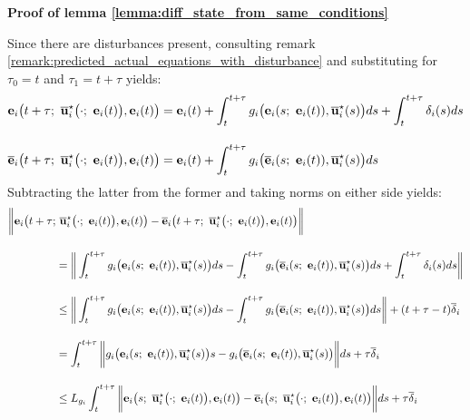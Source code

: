 \begin{gg_box}
\textbf{Proof of lemma \eqref{lemma:diff_state_from_same_conditions}}

Since there are disturbances present, consulting remark
\eqref{remark:predicted_actual_equations_with_disturbance} and substituting
for $\tau_0 = t$ and $\tau_1 = t + \tau$ yields:
\begin{align}
  \vect{e}_i\big(t + \tau;\ \overline{\vect{u}}_i^{\star}\big(\cdot;\ \vect{e}_i(t)\big), \vect{e}_i(t)\big) &=
    \vect{e}_i(t)
    + \int_{t}^{t + \tau} g_i\big(\vect{e}_i(s;\ \vect{e}_i(t)), \overline{\vect{u}}_i^{\star}(s)\big) ds
    + \int_{t}^{t + \tau}\delta_i(s)ds\\[2.5ex]
  \overline{\vect{e}}_i\big(t + \tau;\ \overline{\vect{u}}_i^{\star}\big(\cdot;\ \vect{e}_i(t)\big), \vect{e}_i(t)\big) &=
    \vect{e}_i(t) + \int_{t}^{t + \tau} g_i\big(\overline{\vect{e}}_i(s;\ \vect{e}_i(t)), \overline{\vect{u}}_i^{\star}(s)\big) ds
\end{align}
Subtracting the latter from the former and taking norms on either side yields:
\begin{align}
  \bigg\| \vect{e}_i\big(t + \tau;&\ \overline{\vect{u}}_i^{\star}\big(\cdot;\ \vect{e}_i(t)\big), \vect{e}_i(t)\big) -
  \overline{\vect{e}}_i\big(t + \tau;\ \overline{\vect{u}}_i^{\star}\big(\cdot;\ \vect{e}_i(t)\big), \vect{e}_i(t)\big) \bigg\| \\[2.5ex]
  &=\bigg\| \int_{t}^{t + \tau} g_i\big(\vect{e}_i(s;\ \vect{e}_i(t)), \overline{\vect{u}}_i^{\star}(s)\big) ds
     - \int_{t}^{t + \tau} g_i\big(\overline{\vect{e}}_i(s;\ \vect{e}_i(t)), \overline{\vect{u}}_i^{\star}(s)\big) ds
    + \int_{t}^{t + \tau}\delta_i(s)ds \bigg\| \\[2.5ex]
  & \leq \bigg\| \int_{t}^{t + \tau} g_i\big(\vect{e}_i(s;\ \vect{e}_i(t)), \overline{\vect{u}}_i^{\star}(s)\big) ds
     - \int_{t}^{t + \tau} g_i\big(\overline{\vect{e}}_i(s;\ \vect{e}_i(t)), \overline{\vect{u}}_i^{\star}(s)\big) ds \bigg\|
     + (t + \tau - t)\overline{\delta}_i \\[2.5ex]
  &=
     \int_{t}^{t + \tau} \bigg\| g_i\big(\vect{e}_i(s;\ \vect{e}_i(t)), \overline{\vect{u}}_i^{\star}(s)\big)s
     - g_i\big(\overline{\vect{e}}_i(s;\ \vect{e}_i(t)), \overline{\vect{u}}_i^{\star}(s)\big) \bigg\| ds + \tau \overline{\delta}_i\\[2.5ex]
  &\leq L_{g_i} \int_{t}^{t + \tau} \bigg\| \vect{e}_i\big(s;\ \overline{\vect{u}}_i^{\star}\big(\cdot;\ \vect{e}_i(t)\big), \vect{e}_i(t)\big) -
  \overline{\vect{e}}_i\big(s;\ \overline{\vect{u}}_i^{\star}\big(\cdot;\ \vect{e}_i(t)\big), \vect{e}_i(t)\big) \bigg\| ds + \tau \overline{\delta}_i  \\[2.5ex]

\end{align}
\end{gg_box}
